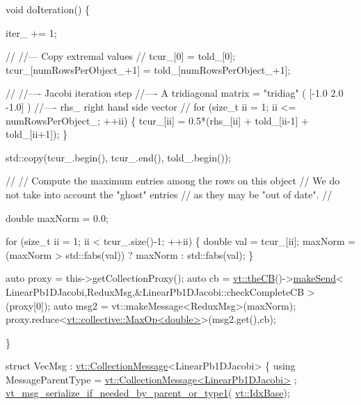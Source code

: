 \begin{DoxyCodeInclude}
  \textcolor{keywordtype}{void} doIteration() \{

    iter\_ += 1;

    \textcolor{comment}{//}
    \textcolor{comment}{//--- Copy extremal values}
    \textcolor{comment}{//}
    tcur\_[0] = told\_[0];
    tcur\_[numRowsPerObject\_+1] = told\_[numRowsPerObject\_+1];

    \textcolor{comment}{//}
    \textcolor{comment}{//---- Jacobi iteration step}
    \textcolor{comment}{//---- A tridiagonal matrix = "tridiag" ( [-1.0  2.0  -1.0] )}
    \textcolor{comment}{//---- rhs\_ right hand side vector}
    \textcolor{comment}{//}
    \textcolor{keywordflow}{for} (\textcolor{keywordtype}{size\_t} ii = 1; ii <= numRowsPerObject\_; ++ii) \{
      tcur\_[ii] = 0.5*(rhs\_[ii] + told\_[ii-1] + told\_[ii+1]);
    \}

    std::copy(tcur\_.begin(), tcur\_.end(), told\_.begin());

    \textcolor{comment}{//}
    \textcolor{comment}{// Compute the maximum entries among the rows on this object}
    \textcolor{comment}{// We do not take into account the "ghost" entries}
    \textcolor{comment}{// as they may be "out of date".}
    \textcolor{comment}{//}

    \textcolor{keywordtype}{double} maxNorm = 0.0;

    \textcolor{keywordflow}{for} (\textcolor{keywordtype}{size\_t} ii = 1; ii < tcur\_.size()-1; ++ii) \{
      \textcolor{keywordtype}{double} val = tcur\_[ii];
      maxNorm = (maxNorm > std::fabs(val)) ? maxNorm : std::fabs(val);
    \}

    \textcolor{keyword}{auto} proxy = this->getCollectionProxy();
    \textcolor{keyword}{auto} cb = \hyperlink{namespacevt_a673b109e94c7bca58313504c83e1da94}{vt::theCB}()->\hyperlink{structvt_1_1pipe_1_1_pipe_manager_a73583be6260418b13ee66e56cdade2da}{makeSend}<
      LinearPb1DJacobi,ReduxMsg,&LinearPb1DJacobi::checkCompleteCB
    >(proxy[0]);
    \textcolor{keyword}{auto} msg2 = vt::makeMessage<ReduxMsg>(maxNorm);
    proxy.reduce<\hyperlink{structvt_1_1collective_1_1reduce_1_1operators_1_1_max_op}{vt::collective::MaxOp<double>}>(msg2.get(),cb);

  \}


  \textcolor{keyword}{struct }VecMsg : \hyperlink{structvt_1_1vrt_1_1collection_1_1_collection_message}{vt::CollectionMessage}<LinearPb1DJacobi> \{
    \textcolor{keyword}{using} MessageParentType = \hyperlink{structvt_1_1vrt_1_1collection_1_1_collection_message}{vt::CollectionMessage<LinearPb1DJacobi>}
      ;
    \hyperlink{message__serialize_8h_a3452798707ea3a45f9da58f7b4673990}{vt\_msg\_serialize\_if\_needed\_by\_parent\_or\_type1}(
      \hyperlink{namespacevt_afb96657e28fa98eb685c5e0c6b1b122e}{vt::IdxBase});


\end{DoxyCodeInclude}
